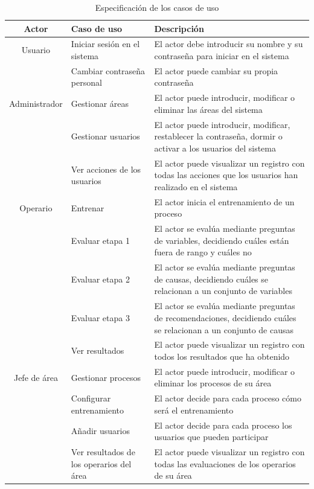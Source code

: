 \begin{table}[H]
\begin{center}
\begin{tabular}{ | c | p{3.5cm} |  p{7.5cm} |}
\hline
\textbf{Actor} & \textbf{Caso de uso} & \textbf{Descripción}\\
\hline
Usuario & Iniciar sesión en el sistema & El actor debe introducir su nombre y su contraseña para iniciar en el sistema \\
\cline{2-3}
& Cambiar contraseña personal  & El actor puede cambiar su propia contraseña \\
\hline
Administrador & Gestionar áreas & El actor puede introducir, modificar o eliminar las áreas del sistema \\
\cline{2-3}
& Gestionar usuarios & El actor puede introducir, modificar, restablecer la contraseña, dormir o activar a los usuarios del sistema \\
\cline{2-3}
& Ver acciones de los usuarios & El actor puede visualizar un registro con todas las acciones que los usuarios han realizado en el sistema \\
\hline
Operario & Entrenar & El actor inicia el entrenamiento de un proceso \\
\cline{2-3}
& Evaluar etapa 1 & El actor se evalúa mediante preguntas de variables, decidiendo cuáles están fuera de rango y cuáles no \\
\cline{2-3}
& Evaluar etapa 2 & El actor se evalúa mediante preguntas de causas, decidiendo cuáles se relacionan a un conjunto de variables \\
\cline{2-3}
& Evaluar etapa 3 & El actor se evalúa mediante preguntas de recomendaciones, decidiendo cuáles se relacionan a un conjunto de causas \\
\cline{2-3}
& Ver resultados & El actor puede visualizar un registro con todos los resultados que ha obtenido \\
\hline
Jefe de área & Gestionar procesos & El actor puede introducir, modificar o eliminar los procesos de su área \\
\cline{2-3}
& Configurar entrenamiento & El actor decide para cada proceso cómo será el entrenamiento \\
\cline{2-3}
& Añadir usuarios & El actor decide para cada proceso los usuarios que pueden participar \\
\cline{2-3}
& Ver resultados de los operarios del área & El actor puede visualizar un registro con todas las evaluaciones de los operarios de su área \\
\hline
\end{tabular}
\caption{Especificación de los casos de uso}
\label{tab:caso-uso}
\end{center}
\end{table}

